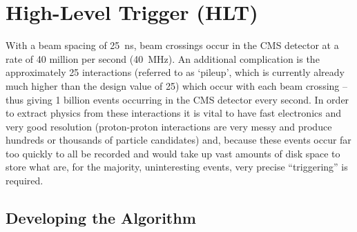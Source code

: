 \chapter{High-Level Trigger (HLT) \label{ch:HLT}}

With a beam spacing of \qty{25}{\ns}, beam crossings occur in the CMS detector at a rate of 40 million per second (\qty{40}{\MHz}). An additional complication is the approximately 25 interactions (referred to as `pileup', which is currently already much higher than the design value of 25) which occur with each beam crossing -- thus giving 1 billion events occurring in the CMS detector every second. In order to extract physics from these interactions it is vital to have fast electronics and very good resolution (proton-proton interactions are very messy and produce hundreds or thousands of particle candidates) and, because these events occur far too quickly to all be recorded and would take up vast amounts of disk space to store what are, for the majority, uninteresting events, very precise ``triggering'' is required.

\section{Developing the Algorithm}
